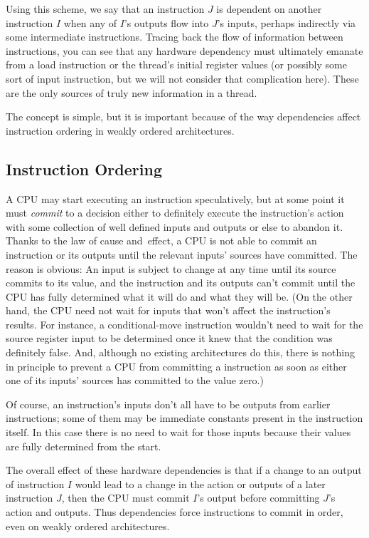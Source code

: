 \documentclass[10]{article}
\begin{document}
Using this scheme, we say that an instruction $J$ is dependent on
another instruction $I$ when any of $I$'s outputs flow into $J$'s inputs,
perhaps indirectly via some intermediate instructions.
Tracing back the flow of information between instructions, you can
see that any hardware dependency must ultimately emanate from a load
instruction or the thread's initial register values (or possibly some sort of
input instruction, but we will not consider that complication here).
These are the only sources of truly new information in a thread.

The concept is simple, but it is important because of the way
dependencies affect instruction ordering in weakly ordered architectures.

\subsection{Instruction Ordering}
\label{sec:Instruction Ordering}

A CPU may start executing an instruction speculatively, but at some
point it must \emph{commit} to a decision either to definitely execute the
instruction's action with some collection of well defined inputs and outputs
or else to abandon it.
Thanks to the law of cause and~effect, a CPU is not able to commit an
instruction or its outputs until the relevant inputs' sources have committed.
The reason is obvious: An input is subject to change at any time until
its source commits to its value,
and the instruction and its outputs can't commit until the CPU has fully
determined what it will do and what they will be.
(On the other hand, the CPU need not wait for inputs that won't affect
the instruction's results.
For instance, a conditional-move instruction wouldn't need to wait for
the source register input to be determined once it knew that the
condition was definitely false.
And, although no existing architectures do this, there is nothing
in principle to prevent a CPU from committing a 
instruction as soon as either one of its inputs' sources has committed to the
value zero.)

Of course, an instruction's inputs don't all have to be outputs from
earlier instructions; some of them may be immediate constants present
in the instruction itself.
In this case there is no need to wait for those inputs because
their values are fully determined from the start.

The overall effect of these hardware dependencies is that if a change to an
output of instruction $I$ would lead to a change in the action or outputs of
a later instruction $J$, then the CPU must commit $I$'s output before
committing $J$'s action and outputs.
Thus dependencies force instructions to commit in order, even on
weakly ordered architectures.
\end{document}
